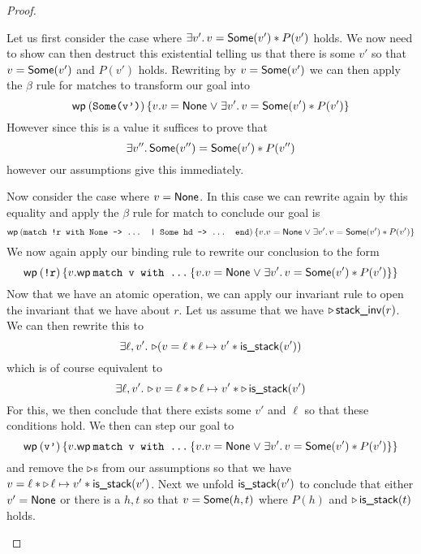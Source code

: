 \begin{proof}
\begin{enumerate}
    Let us first consider the case where
    $\Exists v'. v = \textlog{Some}(v') * P(v')$ holds. We now need to
    show can then destruct this existential telling us that there is
    some $v'$ so that $v = \textsf{Some}(v')$ and $P(v')$
    holds. Rewriting by $v = \textsf{Some}(v')$ we can then apply the
    $\beta$ rule for matches to transform our goal into
    \[
      \wpre{(\text{\tt Some(v')})}{v. v = \textlog{None} \mathrel{\vee} \Exists v'. v = \textlog{Some}(v') * P(v')}
    \]
    However since this is a value it suffices to prove that
    \[
      \Exists v''. \textlog{Some}(v'') = \textlog{Some}(v') * P(v'')
    \]
    however our assumptions give this immediately.

    Now consider the case where $v = \textsf{None}$. In this case we
    can rewrite again by this equality and apply the $\beta$ rule for
    match to conclude our goal is
    \[
      \wpre{(\text{\tt
          match !r with
            None -> ...
          | Some hd -> ... end})}
      {v. v = \textlog{None} \mathrel{\vee} \Exists v'. v = \textlog{Some}(v') * P(v')}
    \]
    We now again apply our binding rule to rewrite our conclusion to
    the form
    \[
      \wpre{(\text{\tt !r})}{v.
       \wpre{\text{\tt match v with ...}}
       {v. v = \textlog{None} \mathrel{\vee} \Exists v'. v = \textlog{Some}(v') * P(v')}
      }
    \]
    Now that we have an atomic operation, we can apply our invariant
    rule to open the invariant that we have about $r$. Let us assume
    that we have $\mathop{{\triangleright}} \textsf{stack\_inv}(r)$. We can then rewrite
    this to
    \[
      \Exists \ell, v'. \later (v = \ell * \ell \mapsto v' * \textlog{is\_stack}(v'))
    \]
    which is of course equivalent to
    \[
      \Exists \ell, v'. \later v = \ell * \later \ell \mapsto v' * \later \textlog{is\_stack}(v')
    \]
    For this, we then conclude that there exists some $v'$ and $\ell$
    so that these conditions hold. We then can step our goal to
    \[
      \wpre{(\text{\tt v'})}{v.
       \wpre{\text{\tt match v with ...}}
       {v. v = \textlog{None} \mathrel{\vee} \Exists v'. v = \textlog{Some}(v') * P(v')}
      }
    \]
    and remove the $\mathop{{\triangleright}}$s from our assumptions so that we have
    $v = \ell * \mathop{{\triangleright}} \ell \mapsto v' * \textsf{is\_stack}(v')$.
    Next we unfold $\textsf{is\_stack}(v')$ to conclude that either
    $v' = \textsf{None}$ or there is a $h, t$ so that
    $v = \textsf{Some}(h, t)$ where $P(h)$ and
    $\mathop{{\triangleright}} \textsf{is\_stack}(t)$ holds.


\end{enumerate}
\end{proof}

